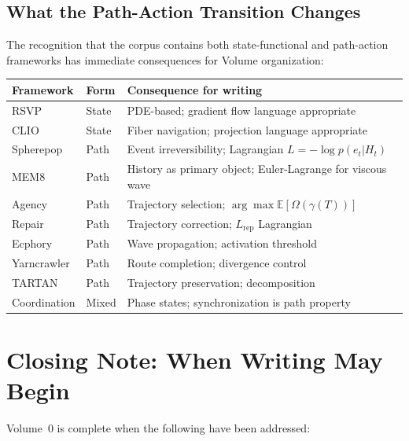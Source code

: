 \documentclass[11pt, a4paper]{book}
\theoremstyle{flyxion}
\theoremstyle{remark}
\begin{document}
\section{What the Path-Action Transition Changes}

The recognition that the corpus contains both state-functional and
path-action frameworks has immediate consequences for Volume
organization:

\medskip
\begin{longtable}{p{4cm}lp{6.5cm}}
\toprule
\textbf{Framework} & \textbf{Form} & \textbf{Consequence for writing} \\
\midrule
RSVP & State & PDE-based; gradient flow language appropriate \\
CLIO & State & Fiber navigation; projection language appropriate \\
Spherepop & Path & Event irreversibility; Lagrangian
  $L = -\log p(e_t|H_t)$ \\
MEM\textbar{}8 & Path & History as primary object; Euler-Lagrange
  for viscous wave \\
Agency & Path & Trajectory selection;
  $\arg\max \mathbb{E}[\Omega(\gamma(T))]$ \\
Repair & Path & Trajectory correction; $L_\mathrm{rep}$ Lagrangian \\
Ecphory & Path & Wave propagation; activation threshold \\
Yarncrawler & Path & Route completion; divergence control \\
TARTAN & Path & Trajectory preservation; decomposition \\
Coordination & Mixed & Phase states; synchronization is path property \\
\bottomrule
\end{longtable}

\chapter*{Closing Note: When Writing May Begin}

Volume~0 is complete when the following have been addressed:
\end{document}
